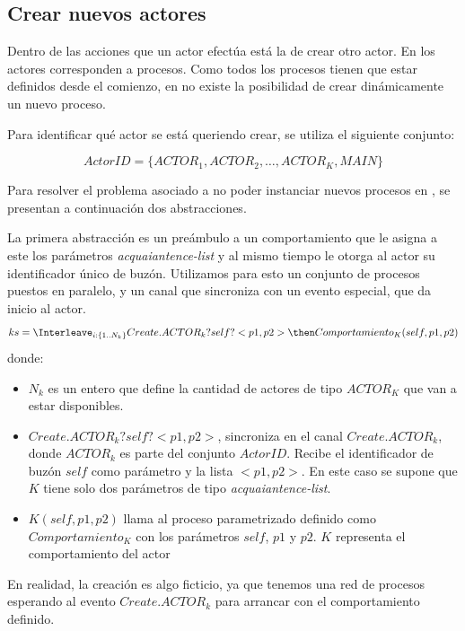 \subsection{Crear nuevos actores}\label{modelo:crear}

Dentro de las acciones que un actor efectúa está la de crear otro actor. En \CSP los actores corresponden a procesos. Como todos los procesos tienen que estar definidos desde el comienzo, en \CSP no existe la posibilidad de crear dinámicamente un nuevo proceso.

Para identificar qué actor se está queriendo crear, se utiliza el siguiente conjunto: 

\begin{equation}\label{eq:actorid}
  ActorID = \Big\{ ACTOR_1, ACTOR_2, \ldots, ACTOR_K, MAIN \Big\}
\end{equation}

Para resolver el problema asociado a no poder instanciar nuevos procesos en \CSP, se presentan a continuación dos abstracciones.

La primera abstracción es un preámbulo a un comportamiento que le asigna a este los parámetros \textit{acquaiantence-list} y al mismo tiempo le otorga al actor su identificador único de buzón. Utilizamos para esto un conjunto de procesos puestos en paralelo, y un canal que sincroniza con un evento especial, que da inicio al actor.
\begin{equation}\label{eq:createactor}
ks = \Interleave_{i: \{1 .. N_k\}} Create.ACTOR_k?self?<p1, p2> \then Comportamiento_K(self, p1, p2) 
\end{equation}
donde:
\begin{itemize}
 \item $N_k$ es un entero que define la cantidad de actores de tipo $ACTOR_K$ que van a estar disponibles.
 \item $Create.ACTOR_k?self?<p1, p2>$, sincroniza en el canal $Create.ACTOR_k$, donde $ACTOR_k$ es parte del conjunto $ActorID$. Recibe el identificador de buzón $self$ como parámetro y la lista $<p1, p2>$. En este caso se supone que $K$ tiene solo dos parámetros de tipo \textit{acquaiantence-list}. 
 \item $K(self, p1, p2)$ llama al proceso parametrizado definido como $Comportamiento_K$ con los parámetros $self$, $p1$ y $p2$. $K$ representa el comportamiento del actor
\end{itemize}

En realidad, la creación es algo ficticio, ya que tenemos una red de procesos \CSP esperando al evento $Create.ACTOR_k$ para arrancar con el comportamiento definido. 

